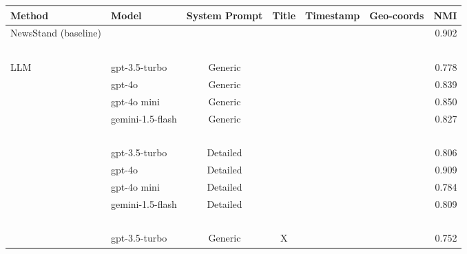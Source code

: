 \begin{table*}[ht!]
    \centering
    \begin{tabular}{l|l|cccc|r}
        \textbf{Method}       & \textbf{Model}    & \textbf{System Prompt} & \textbf{Title} & \textbf{Timestamp} & \textbf{Geo-coords} &\textbf{NMI} \\
        \hline
        NewsStand (baseline)  & ~                 & ~                      & ~              & ~                  & ~                    & 0.902 \\
        ~                     & ~                 & ~                      & ~              & ~                  & ~                    & ~   \\
        LLM                   & gpt-3.5-turbo     & Generic                & ~              & ~                  & ~                    & 0.778 \\
        ~                     & gpt-4o            & Generic                & ~              & ~                  & ~                    & 0.839 \\
        ~                     & gpt-4o mini       & Generic                & ~              & ~                  & ~                    & 0.850 \\
        ~                     & gemini-1.5-flash  & Generic                & ~              & ~                  & ~                    & 0.827 \\
        ~                     & ~                 & ~                      & ~              & ~                  & ~                    & ~   \\
        ~                     & gpt-3.5-turbo     & Detailed               & ~              & ~                  & ~                    & 0.806 \\
        ~                     & gpt-4o            & Detailed               & ~              & ~                  & ~                    & 0.909 \\
        ~                     & gpt-4o mini       & Detailed               & ~              & ~                  & ~                    & 0.784 \\
        ~                     & gemini-1.5-flash  & Detailed               & ~              & ~                  & ~                    & 0.809 \\
        ~                     & ~                 & ~                      & ~              & ~                  & ~                    & ~   \\
        ~                     & gpt-3.5-turbo     & Generic               & X              & ~                  & ~                    & 0.752 \\

\end{tabular}
\end{table*}
